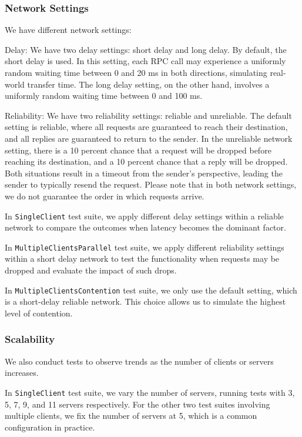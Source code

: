 \documentclass[11pt,a4paper]{article}
\begin{document}
\subsubsection{Network Settings}
We have different network settings:

Delay: We have two delay settings: short delay and long delay. By default, the short delay is used. In this setting, each RPC call may experience a uniformly random waiting time between 0 and 20 ms in both directions, simulating real-world transfer time. The long delay setting, on the other hand, involves a uniformly random waiting time between 0 and 100 ms.

Reliability: We have two reliability settings: reliable and unreliable. The default setting is reliable, where all requests are guaranteed to reach their destination, and all replies are guaranteed to return to the sender. In the unreliable network setting, there is a 10 percent chance that a request will be dropped before reaching its destination, and a 10 percent chance that a reply will be dropped. Both situations result in a timeout from the sender's perspective, leading the sender to typically resend the request. Please note that in both network settings, we do not guarantee the order in which requests arrive.

In \verb|SingleClient| test suite, we apply different delay settings within a reliable network to compare the outcomes when latency becomes the dominant factor.

In \verb|MultipleClientsParallel| test suite, we apply different reliability settings within a short delay network to test the functionality when requests may be dropped and evaluate the impact of such drops.

In \verb|MultipleClientsContention| test suite, we only use the default setting, which is a short-delay reliable network. This choice allows us to simulate the highest level of contention.

\subsubsection{Scalability}
We also conduct tests to observe trends as the number of clients or servers increases.

In \verb|SingleClient| test suite, we vary the number of servers, running tests with 3, 5, 7, 9, and 11 servers respectively. For the other two test suites involving multiple clients, we fix the number of servers at 5, which is a common configuration in practice.
\end{document}

